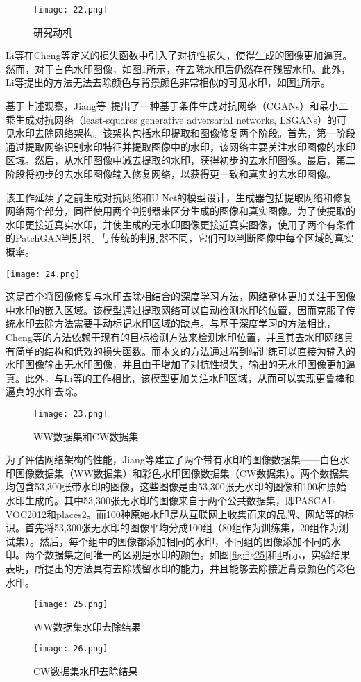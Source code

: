 \begin{figure}[!htbp]
	\centering
	\texttt{[image: 22.png]}
	\caption{研究动机}
	\label{fig:22}
\end{figure}

Li等在Cheng等定义的损失函数中引入了对抗性损失，使得生成的图像更加逼真。然而，对于白色水印图像，如图1所示，在去除水印后仍然存在残留水印。此外，Li等提出的方法无法去除颜色与背景颜色非常相似的可见水印，如图\ref{fig:22}所示。

基于上述观察，Jiang等~\cite{jiang2020two}提出了一种基于条件生成对抗网络（CGANs）和最小二乘生成对抗网络（least-squares generative adversarial networks, LSGANs）的可见水印去除网络架构。该架构包括水印提取和图像修复两个阶段。首先，第一阶段通过提取网络识别水印特征并提取图像中的水印，该网络主要关注水印图像的水印区域。然后，从水印图像中减去提取的水印，获得初步的去水印图像。最后，第二阶段将初步的去水印图像输入修复网络，以获得更一致和真实的去水印图像。

该工作延续了之前生成对抗网络和U-Net的模型设计，生成器包括提取网络和修复网络两个部分，同样使用两个判别器来区分生成的图像和真实图像。为了使提取的水印更接近真实水印，并使生成的无水印图像更接近真实图像，使用了两个有条件的PatchGAN判别器。与传统的判别器不同，它们可以判断图像中每个区域的真实概率。

\begin{figure*}[!htbp]
	\centering
	\texttt{[image: 24.png]}
	\caption{基于条件生成对抗网络和最小二乘生成对抗网络的两阶段水印去除框架示意图}
	\label{fig:24}
\end{figure*}


这是首个将图像修复与水印去除相结合的深度学习方法，网络整体更加关注于图像中水印的嵌入区域。该模型通过提取网络可以自动检测水印的位置，因而克服了传统水印去除方法需要手动标记水印区域的缺点。与基于深度学习的方法相比，Cheng等的方法依赖于现有的目标检测方法来检测水印位置，并且其去水印网络具有简单的结构和低效的损失函数。而本文的方法通过端到端训练可以直接为输入的水印图像输出无水印图像，并且由于增加了对抗性损失，输出的无水印图像更加逼真。此外，与Li等的工作相比，该模型更加关注水印区域，从而可以实现更鲁棒和逼真的水印去除。

\begin{figure}[!htbp]
	\centering
	\texttt{[image: 23.png]}
	\caption{WW数据集和CW数据集}
	\label{fig:23}
\end{figure}

为了评估网络架构的性能，Jiang等建立了两个带有水印的图像数据集——白色水印图像数据集（WW数据集）和彩色水印图像数据集（CW数据集）。两个数据集均包含53,300张带水印的图像，这些图像是由53,300张无水印的图像和100种原始水印生成的。其中53,300张无水印的图像来自于两个公共数据集，即PASCAL VOC2012和places2。而100种原始水印是从互联网上收集而来的品牌、网站等的标识。首先将53,300张无水印的图像平均分成100组（80组作为训练集，20组作为测试集）。然后，每个组中的图像都添加相同的水印，不同组的图像添加不同的水印。两个数据集之间唯一的区别是水印的颜色。如图\ref{fig:fig25}和\ref{fig:26}所示，实验结果表明，所提出的方法具有去除残留水印的能力，并且能够去除接近背景颜色的彩色水印。

\begin{figure}[!htbp]
	\centering
	\texttt{[image: 25.png]}
	\caption{WW数据集水印去除结果}
	\label{fig:25}
\end{figure}

\begin{figure}[!htbp]
	\centering
	\texttt{[image: 26.png]}
	\caption{CW数据集水印去除结果}
	\label{fig:26}
\end{figure}
